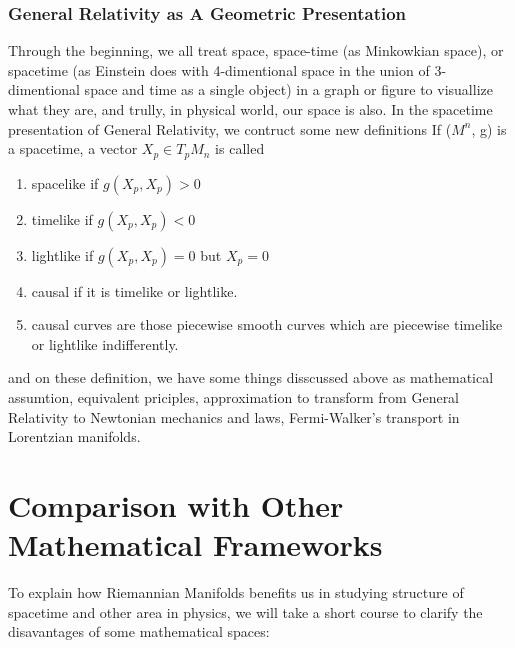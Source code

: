 \documentclass[11pt,a4paper]{article}
\begin{document}
	\subsubsection{General Relativity as A Geometric Presentation}
	Through the beginning, we all treat space, space-time (as Minkowkian space), or spacetime (as Einstein does with 4-dimentional space in the union of 3-dimentional space and time as a single object) in a graph or figure to visuallize what they are, and trully, in physical world, our space is also. In the spacetime presentation of General Relativity, we contruct some new definitions
	If ($M^n$, g) is a spacetime, a vector $X_p \in T_p M_n$ is called \\
	\begin{enumerate}
		\item spacelike if $g(X_p, X_p) > 0$
		\item timelike if $g(X_p, X_p) < 0$
		\item lightlike if $g(X_p, X_p) = 0$ but $X_p = 0$
		\item causal if it is timelike or lightlike. 
		\item causal curves are those piecewise smooth curves which are piecewise timelike or lightlike
		indifferently. 
	\end{enumerate}
	
	and on these definition, we have some things disscussed above as mathematical assumtion, equivalent priciples, approximation to transform from General Relativity to Newtonian mechanics and laws, Fermi-Walker’s transport in Lorentzian manifolds.
	\section{Comparison with Other Mathematical Frameworks}
	To explain how Riemannian Manifolds benefits us in studying structure of spacetime and other area in physics, we will  take a short  course to clarify the disavantages of some mathematical spaces:
\end{document}
